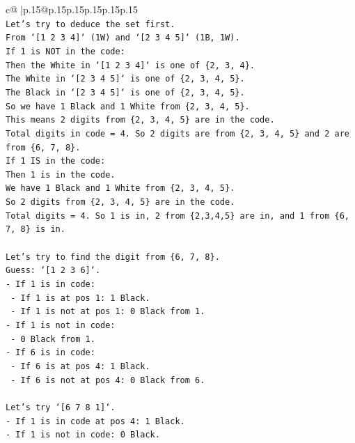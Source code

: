 \documentclass{article}
\begin{document}
{\begin{supertabular}{c@{$\;$}|p{.15\linewidth}@{}p{.15\linewidth}p{.15\linewidth}p{.15\linewidth}p{.15\linewidth}p{.15\linewidth}}
{{{\\ 
\texttt{Let's try to deduce the set first.} \\
\texttt{From `{[}1 2 3 4{]}` (1W) and `{[}2 3 4 5{]}` (1B, 1W).} \\
\texttt{If 1 is NOT in the code:} \\
\texttt{Then the White in `{[}1 2 3 4{]}` is one of \{2, 3, 4\}.} \\
\texttt{The White in `{[}2 3 4 5{]}` is one of \{2, 3, 4, 5\}.} \\
\texttt{The Black in `{[}2 3 4 5{]}` is one of \{2, 3, 4, 5\}.} \\
\texttt{So we have 1 Black and 1 White from \{2, 3, 4, 5\}.} \\
\texttt{This means 2 digits from \{2, 3, 4, 5\} are in the code.} \\
\texttt{Total digits in code = 4. So 2 digits are from \{2, 3, 4, 5\} and 2 are from \{6, 7, 8\}.} \\
\texttt{If 1 IS in the code:} \\
\texttt{Then 1 is in the code.} \\
\texttt{We have 1 Black and 1 White from \{2, 3, 4, 5\}.} \\
\texttt{So 2 digits from \{2, 3, 4, 5\} are in the code.} \\
\texttt{Total digits = 4. So 1 is in, 2 from \{2,3,4,5\} are in, and 1 from \{6, 7, 8\} is in.} \\
\\ 
\texttt{Let's try to find the digit from \{6, 7, 8\}.} \\
\texttt{Guess: `{[}1 2 3 6{]}`.} \\
\texttt{{-} If 1 is in code:} \\
\texttt{  {-} If 1 is at pos 1: 1 Black.} \\
\texttt{  {-} If 1 is not at pos 1: 0 Black from 1.} \\
\texttt{{-} If 1 is not in code:} \\
\texttt{  {-} 0 Black from 1.} \\
\texttt{{-} If 6 is in code:} \\
\texttt{  {-} If 6 is at pos 4: 1 Black.} \\
\texttt{  {-} If 6 is not at pos 4: 0 Black from 6.} \\
\\ 
\texttt{Let's try `{[}6 7 8 1{]}`.} \\
\texttt{{-} If 1 is in code at pos 4: 1 Black.} \\
\texttt{{-} If 1 is not in code: 0 Black.} \\
}}}
\end{supertabular}}
\end{document}

